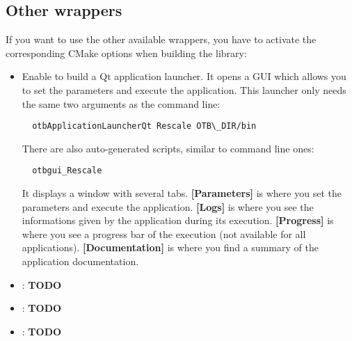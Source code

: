 \subsection{Other wrappers}\label{sec:wrappedAppliOtherWrap}
If you want to use the other available wrappers, you have to activate the corresponding CMake 
options when building the library:
\begin{itemize}
  \item Enable  to build a Qt application launcher. It opens a GUI which 
  allows you to set the parameters and execute the application. This launcher only needs 
  the same two arguments as the command line:
  \begin{verbatim}
  otbApplicationLauncherQt Rescale OTB\_DIR/bin
  \end{verbatim}
  There are also auto-generated scripts, similar to command line ones:
  \begin{verbatim}
  otbgui_Rescale
  \end{verbatim}
  It displays a window with several tabs. \textbf{[Parameters]} is where you set the parameters and execute the application.
  \textbf{[Logs]} is where you see the informations given by the application during its execution. \textbf{[Progress]} is 
  where you see a progress bar of the execution (not available for all applications). \textbf{[Documentation]} is where you
  find a summary of the application documentation.
   
  \item {} : \textbf{TODO}
  \item {} : \textbf{TODO}
  \item {} : \textbf{TODO}
\end{itemize}

